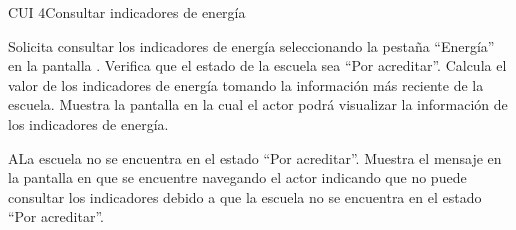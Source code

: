 \begin{UseCase}{CUI 4}{Consultar indicadores de energía}
	



	

	
\end{UseCase}
 \begin{UCtrayectoria}
    \UCpaso[\UCactor] Solicita consultar los indicadores de energía seleccionando la pestaña ``Energía'' en la pantalla .
    \UCpaso[\UCsist] Verifica que el estado de la escuela sea ``Por acreditar''.   
    \UCpaso[\UCsist] Calcula el valor de los indicadores de energía tomando la información más reciente de la escuela.%
    \UCpaso[\UCsist] Muestra la pantalla  en la cual el actor podrá visualizar la información de los indicadores de energía.
\end{UCtrayectoria}
 

 \begin{UCtrayectoriaA}{A}{La escuela no se encuentra en el estado ``Por acreditar''.}
    \UCpaso[\UCsist] Muestra el mensaje  en la pantalla en que se encuentre navegando el
    actor indicando que no puede consultar los indicadores debido a que la escuela no se encuentra en el estado ``Por acreditar''. 
 \end{UCtrayectoriaA}

